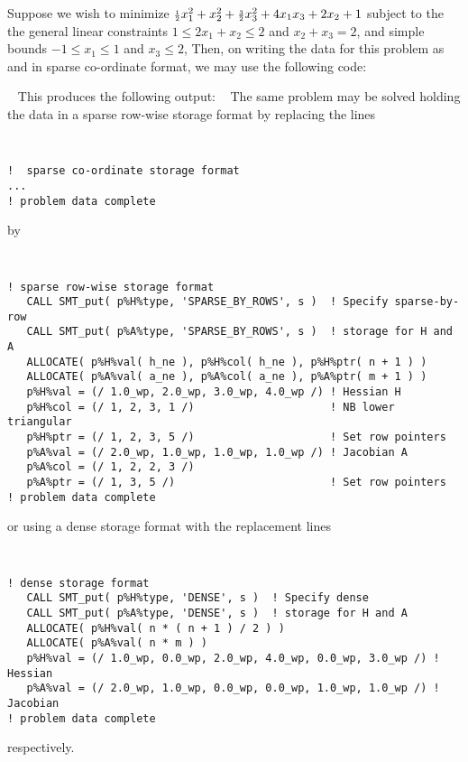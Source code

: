 \documentclass{galahad}
\begin{document}
\galexample
Suppose we wish to minimize
${\scriptstyle \frac{1}{2}} x_1^2 + x_2^2 + {\scriptstyle \frac{3}{2}} x_3^2 + 4 x_1 x_3 + 2 x_2 + 1$
subject to the the general linear constraints
$1 \leq  2 x_{1}  +  x_{2}  \leq  2$ and
$x_{2}  +  x_{3}  =  2$, and simple bounds
$-1  \leq  x_{1}  \leq  1$ and $x_{3}  \leq  2$,
Then, on writing the data for this problem as
and
in sparse co-ordinate format,
we may use the following code:

{\tt \small
\VerbatimInput{\packageexample}
}
\noindent
This produces the following output:
{\tt \small
\VerbatimInput{\packageresults}
}
\noindent
The same problem may be solved holding the data in 
a sparse row-wise storage format by replacing the lines
{\tt \small
\begin{verbatim}
!  sparse co-ordinate storage format
...
! problem data complete   
\end{verbatim}
}
\noindent
by
{\tt \small
\begin{verbatim}
! sparse row-wise storage format
   CALL SMT_put( p%H%type, 'SPARSE_BY_ROWS', s )  ! Specify sparse-by-row
   CALL SMT_put( p%A%type, 'SPARSE_BY_ROWS', s )  ! storage for H and A
   ALLOCATE( p%H%val( h_ne ), p%H%col( h_ne ), p%H%ptr( n + 1 ) )
   ALLOCATE( p%A%val( a_ne ), p%A%col( a_ne ), p%A%ptr( m + 1 ) )
   p%H%val = (/ 1.0_wp, 2.0_wp, 3.0_wp, 4.0_wp /) ! Hessian H
   p%H%col = (/ 1, 2, 3, 1 /)                     ! NB lower triangular
   p%H%ptr = (/ 1, 2, 3, 5 /)                     ! Set row pointers
   p%A%val = (/ 2.0_wp, 1.0_wp, 1.0_wp, 1.0_wp /) ! Jacobian A
   p%A%col = (/ 1, 2, 2, 3 /)
   p%A%ptr = (/ 1, 3, 5 /)                        ! Set row pointers  
! problem data complete   
\end{verbatim}
}
\noindent
or using a dense storage format with the replacement lines
{\tt \small
\begin{verbatim}
! dense storage format
   CALL SMT_put( p%H%type, 'DENSE', s )  ! Specify dense
   CALL SMT_put( p%A%type, 'DENSE', s )  ! storage for H and A
   ALLOCATE( p%H%val( n * ( n + 1 ) / 2 ) )
   ALLOCATE( p%A%val( n * m ) )
   p%H%val = (/ 1.0_wp, 0.0_wp, 2.0_wp, 4.0_wp, 0.0_wp, 3.0_wp /) ! Hessian
   p%A%val = (/ 2.0_wp, 1.0_wp, 0.0_wp, 0.0_wp, 1.0_wp, 1.0_wp /) ! Jacobian
! problem data complete   
\end{verbatim}
}
\noindent
respectively.
\end{document}
